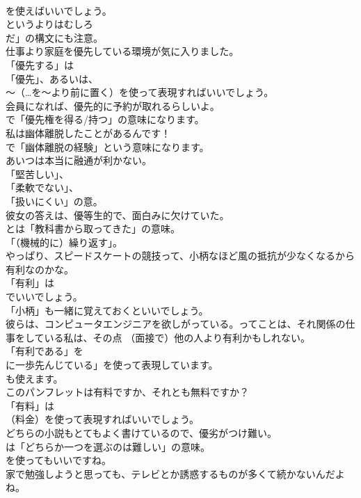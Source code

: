 \documentclass[8pt]{extreport}
\begin{document}
\begin{CJK}{UTF8}{min}
\\	を使えばいいでしょう。
\\	というよりはむしろ
\\	だ」の構文にも注意。	
\\	仕事より家庭を優先している環境が気に入りました。 
\\	「優先する」は
\\	「優先」、あるいは、
\\	～（…を～より前に置く）を使って表現すればいいでしょう。	
\\	会員になれば、優先的に予約が取れるらしいよ。 
\\	で「優先権を得る/持つ」の意味になります。	
\\	私は幽体離脱したことがあるんです！ 
\\	で「幽体離脱の経験」という意味になります。	
\\	あいつは本当に融通が利かない。 
\\	「堅苦しい」、
\\	「柔軟でない」、
\\	「扱いにくい」の意。	
\\	彼女の答えは、優等生的で、面白みに欠けていた。 
\\	とは「教科書から取ってきた」の意味。
\\	「（機械的に）繰り返す」。	
\\	やっぱり、スピードスケートの競技って、小柄なほど風の抵抗が少なくなるから有利なのかな。 
\\	「有利」は
\\	でいいでしょう。
\\	「小柄」も一緒に覚えておくといいでしょう。	
\\	彼らは、コンピュータエンジニアを欲しがっている。ってことは、それ関係の仕事をしている私は、その点 （面接で）他の人より有利かもしれない。 
\\	「有利である」を
\\	に一歩先んじている」を使って表現しています。
\\	も使えます。	
\\	このパンフレットは有料ですか、それとも無料ですか？ 
\\	「有料」は 
\\	（料金）を使って表現すればいいでしょう。	
\\	どちらの小説もとてもよく書けているので、優劣がつけ難い。 
\\	は「どちらか一つを選ぶのは難しい」の意味。
\\	を使ってもいいですね。	
\\	家で勉強しようと思っても、テレビとか誘惑するものが多くて続かないんだよね。 

\end{CJK}
\end{document}
